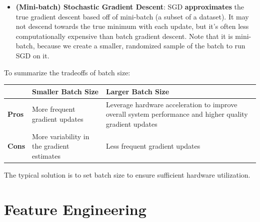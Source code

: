 \documentclass[
  letterpaper,
  DIV=11,
  numbers=noendperiod]{scrreprt}
\providecommand{\tightlist}{%
  \setlength{\itemsep}{0pt}\setlength{\parskip}{0pt}}\usepackage{longtable,booktabs,array}
\begin{document}
\begin{itemize}
\tightlist
\item
  \textbf{(Mini-batch) Stochastic Gradient Descent}: SGD
  \textbf{approximates} the true gradient descent based off of
  mini-batch (a subset of a dataset). It may not descend towards the
  true minimum with each update, but it's often less computationally
  expensive than batch gradient descent. Note that it is mini-batch,
  because we create a smaller, randomized sample of the batch to run SGD
  on it.
\end{itemize}

To summarize the tradeoffs of batch size:

\begin{longtable}[]{@{}
  >{\raggedright\arraybackslash}p{}
  >{\raggedright\arraybackslash}p{}
  >{\raggedright\arraybackslash}p{}@{}}
\toprule\noalign{}
\begin{minipage}[b]{\linewidth}\raggedright
\end{minipage} & \begin{minipage}[b]{\linewidth}\raggedright
Smaller Batch Size
\end{minipage} & \begin{minipage}[b]{\linewidth}\raggedright
Larger Batch Size
\end{minipage} \\
\midrule\noalign{}
\endhead
\bottomrule\noalign{}
\endlastfoot
\textbf{Pros} & More frequent gradient updates & Leverage hardware
acceleration to improve overall system performance and higher quality
gradient updates \\
\textbf{Cons} & More variability in the gradient estimates & Less
frequent gradient updates \\
\end{longtable}

The typical solution is to set batch size to ensure sufficient hardware
utilization.

\section{Feature Engineering}\label{feature-engineering}
\end{document}
